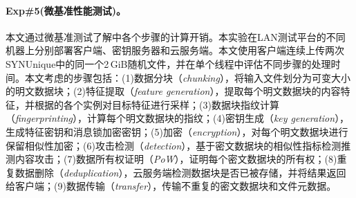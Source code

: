 \paragraph*{Exp\#5(微基准性能测试)。}
本文通过微基准测试了解\prototype 中各个步骤的计算开销。本实验在LAN测试平台的不同机器上分别部署客户端、密钥服务器和云服务端。本文使用客户端连续上传两次SYNUnique中的同一个2\,GiB随机文件，并在单个线程中评估不同步骤的处理时间。本文考虑的步骤包括：(1)数据分块（{\em chunking}），将输入文件划分为可变大小的明文数据块；(2)特征提取（{\em feature generation}），提取每个明文数据块的内容特征，并根据\sysnameF 的各个实例对目标特征进行采样；(3)数据块指纹计算（{\em fingerprinting}），计算每个明文数据块的指纹；(4)密钥生成（{\em key generation}），生成特征密钥和消息锁加密密钥；(5)加密（{\em encryption}），对每个明文数据块进行保留相似性加密；(6)攻击检测（{\em detection}），基于密文数据块的相似性指标检测推测内容攻击；(7)数据所有权证明（{\em PoW}），证明每个密文数据块的所有权；(8)重复数据删除（{\em deduplication}），云服务端检测数据块是否已被存储，并将结果返回给客户端；(9)数据传输（{\em transfer}），传输不重复的密文数据块和文件元数据。

